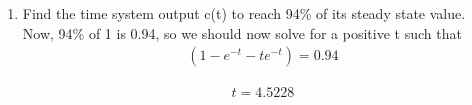 \begin{enumerate}[label=\thesection.\arabic*.,ref=\thesection.\theenumi]
\item Find the time system output c(t) to reach 94\% of its steady state value.
\\
\solution 
Now, 94\% of 1 is 0.94, so we should now solve for a positive t such that
\begin{align}
(1 - e^{-t} - te^{-t}) = 0.94
\end{align}

\begin{align}
 t = 4.5228
\end{align}


 





\end{enumerate}
